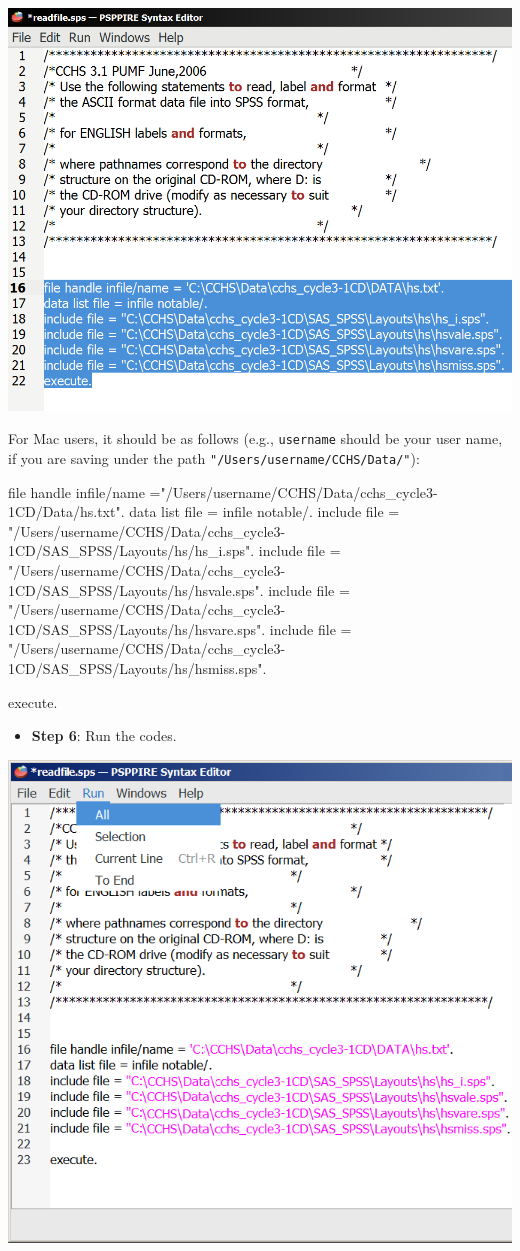 \documentclass[
]{book}
\newenvironment{Shaded}{\begin{snugshade}}{\end{snugshade}}
\newcommand{\NormalTok}[1]{#1}
\newcommand{\OtherTok}[1]{\textcolor[rgb]{0.56,0.35,0.01}{#1}}
\newcommand{\SpecialCharTok}[1]{\textcolor[rgb]{0.00,0.00,0.00}{#1}}
\newcommand{\StringTok}[1]{\textcolor[rgb]{0.31,0.60,0.02}{#1}}
\providecommand{\tightlist}{%
  \setlength{\itemsep}{0pt}\setlength{\parskip}{0pt}}
\begin{document}
\includegraphics[width=0.65\linewidth]{images/abacusX34}

For Mac users, it should be as follows (e.g., \texttt{username} should be your user name, if you are saving under the path \texttt{"/Users/username/CCHS/Data/"}):

\begin{Shaded}
\begin{Highlighting}[]
\NormalTok{file handle infile}\SpecialCharTok{/}\NormalTok{name }\OtherTok{=}\StringTok{"/Users/username/CCHS/Data/cchs\_cycle3{-}1CD/Data/hs.txt"}\NormalTok{.}
\NormalTok{data list file }\OtherTok{=}\NormalTok{ infile notable}\SpecialCharTok{/}\NormalTok{.}
\NormalTok{include file }\OtherTok{=} \StringTok{"/Users/username/CCHS/Data/cchs\_cycle3{-}1CD/SAS\_SPSS/Layouts/hs/hs\_i.sps"}\NormalTok{.}
\NormalTok{include file }\OtherTok{=} \StringTok{"/Users/username/CCHS/Data/cchs\_cycle3{-}1CD/SAS\_SPSS/Layouts/hs/hsvale.sps"}\NormalTok{.}
\NormalTok{include file }\OtherTok{=} \StringTok{"/Users/username/CCHS/Data/cchs\_cycle3{-}1CD/SAS\_SPSS/Layouts/hs/hsvare.sps"}\NormalTok{.}
\NormalTok{include file }\OtherTok{=} \StringTok{"/Users/username/CCHS/Data/cchs\_cycle3{-}1CD/SAS\_SPSS/Layouts/hs/hsmiss.sps"}\NormalTok{.}

\NormalTok{execute.}
\end{Highlighting}
\end{Shaded}

\begin{itemize}
\tightlist
\item
  \textbf{Step 6}: Run the codes.
\end{itemize}

\includegraphics[width=0.65\linewidth]{images/abacus35}
\end{document}

